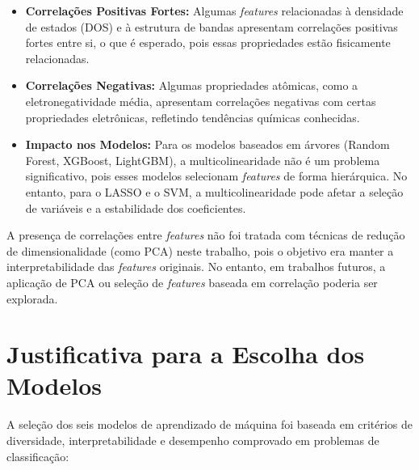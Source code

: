 \documentclass[12pt, a4paper, oneside]{report}
\begin{document}
\begin{itemize}
    \item \textbf{Correlações Positivas Fortes:} Algumas \textit{features} relacionadas à densidade de estados (DOS) e à estrutura de bandas apresentam correlações positivas fortes entre si, o que é esperado, pois essas propriedades estão fisicamente relacionadas.
    \item \textbf{Correlações Negativas:} Algumas propriedades atômicas, como a eletronegatividade média, apresentam correlações negativas com certas propriedades eletrônicas, refletindo tendências químicas conhecidas.
    \item \textbf{Impacto nos Modelos:} Para os modelos baseados em árvores (Random Forest, XGBoost, LightGBM), a multicolinearidade não é um problema significativo, pois esses modelos selecionam \textit{features} de forma hierárquica. No entanto, para o LASSO e o SVM, a multicolinearidade pode afetar a seleção de variáveis e a estabilidade dos coeficientes.
\end{itemize}

A presença de correlações entre \textit{features} não foi tratada com técnicas de redução de dimensionalidade (como PCA) neste trabalho, pois o objetivo era manter a interpretabilidade das \textit{features} originais. No entanto, em trabalhos futuros, a aplicação de PCA ou seleção de \textit{features} baseada em correlação poderia ser explorada.

\section{Justificativa para a Escolha dos Modelos}

A seleção dos seis modelos de aprendizado de máquina foi baseada em critérios de diversidade, interpretabilidade e desempenho comprovado em problemas de classificação:
\end{document}
